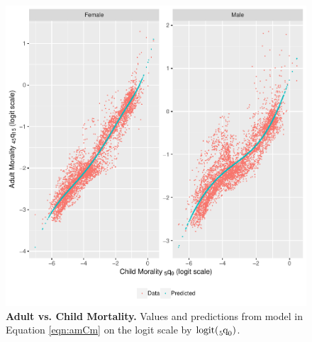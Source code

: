 \documentclass[11pt]{article}
\newcommand{\qf}{\tensor*[_5]{\mbox{q}}{_0}}
\newcommand{\logit}{\mbox{logit}}
\begin{document}
\begin{appendices}
\begin{figure}[htbp]
   \centering
   \includegraphics[width=0.94\linewidth]{../figures/fig2-2.pdf} 
   \captionsetup{format=plain,font=normalsize,margin=0cm,justification=justified}
   \caption{\textbf{Adult vs. Child Mortality.} Values and predictions from model in Equation \ref{eqn:amCm} on the logit scale by $\logit(\qf)$.}
   \label{fig:adultChild}
\end{figure}


\end{appendices}
\end{document}
